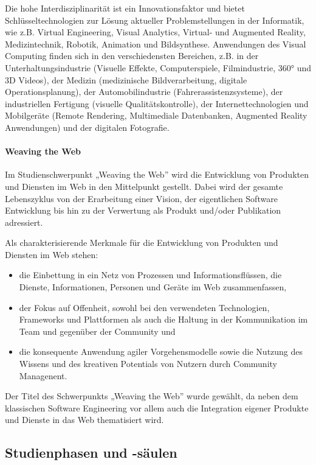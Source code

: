 Die hohe Interdisziplinarität ist ein Innovationsfaktor und bietet
Schlüsseltechnologien zur Lösung aktueller Problemstellungen in der
Informatik, wie z.B. Virtual Engineering, Visual Analytics, Virtual- und
Augmented Reality, Medizintechnik, Robotik, Animation und Bildsynthese.
Anwendungen des Visual Computing finden sich in den verschiedensten
Bereichen, z.B. in der Unterhaltungsindustrie (Visuelle Effekte,
Computerspiele, Filmindustrie, 360° und 3D Videos), der Medizin
(medizinische Bildverarbeitung, digitale Operationsplanung), der
Automobilindustrie (Fahrerassistenzsysteme), der industriellen Fertigung
(visuelle Qualitätskontrolle), der Internettechnologien und Mobilgeräte
(Remote Rendering, Multimediale Datenbanken, Augmented Reality
Anwendungen) und der digitalen Fotografie.

\paragraph{Weaving the Web}\label{weaving-the-web}

Im Studienschwerpunkt „Weaving the Web'' wird die Entwicklung von
Produkten und Diensten im Web in den Mittelpunkt gestellt. Dabei wird
der gesamte Lebenszyklus von der Erarbeitung einer Vision, der
eigentlichen Software Entwicklung bis hin zu der Verwertung als Produkt
und/oder Publikation adressiert.

Als charakterisierende Merkmale für die Entwicklung von Produkten und
Diensten im Web stehen:

\begin{itemize}
\tightlist
\item
  die Einbettung in ein Netz von Prozessen und Informationsflüssen, die
  Dienste, Informationen, Personen und Geräte im Web zusammenfassen,
\item
  der Fokus auf Offenheit, sowohl bei den verwendeten Technologien,
  Frameworks und Plattformen als auch die Haltung in der Kommunikation
  im Team und gegenüber der Community und
\item
  die konsequente Anwendung agiler Vorgehensmodelle sowie die Nutzung
  des Wissens und des kreativen Potentials von Nutzern durch Community
  Managenent.
\end{itemize}

Der Titel des Schwerpunkts „Weaving the Web'' wurde gewählt, da neben
dem klassischen Software Engineering vor allem auch die Integration
eigener Produkte und Dienste in das Web thematisiert wird.

\subsection{Studienphasen und
-säulen}\label{studienphasen-und--suxe4ulen-1}

